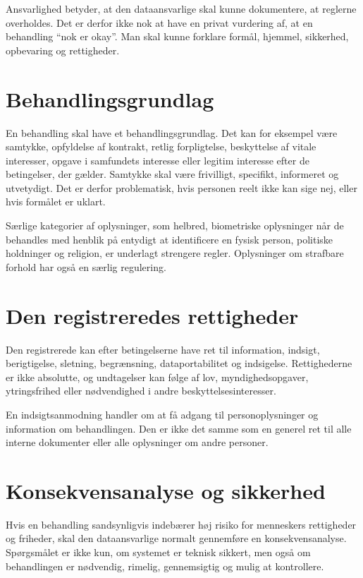 Ansvarlighed betyder, at den dataansvarlige skal kunne dokumentere, at reglerne overholdes. Det er derfor ikke nok at have en privat vurdering af, at en behandling ``nok er okay''. Man skal kunne forklare formål, hjemmel, sikkerhed, opbevaring og rettigheder.

\section{Behandlingsgrundlag}

En behandling skal have et behandlingsgrundlag. Det kan for eksempel være samtykke, opfyldelse af kontrakt, retlig forpligtelse, beskyttelse af vitale interesser, opgave i samfundets interesse eller legitim interesse efter de betingelser, der gælder. Samtykke skal være frivilligt, specifikt, informeret og utvetydigt. Det er derfor problematisk, hvis personen reelt ikke kan sige nej, eller hvis formålet er uklart.

Særlige kategorier af oplysninger, som helbred, biometriske oplysninger når de behandles med henblik på entydigt at identificere en fysisk person, politiske holdninger og religion, er underlagt strengere regler. Oplysninger om strafbare forhold har også en særlig regulering.

\section{Den registreredes rettigheder}

Den registrerede kan efter betingelserne have ret til information, indsigt, berigtigelse, sletning, begrænsning, dataportabilitet og indsigelse. Rettighederne er ikke absolutte, og undtagelser kan følge af lov, myndighedsopgaver, ytringsfrihed eller nødvendighed i andre beskyttelsesinteresser.

En indsigtsanmodning handler om at få adgang til personoplysninger og information om behandlingen. Den er ikke det samme som en generel ret til alle interne dokumenter eller alle oplysninger om andre personer.

\section{Konsekvensanalyse og sikkerhed}

Hvis en behandling sandsynligvis indebærer høj risiko for menneskers rettigheder og friheder, skal den dataansvarlige normalt gennemføre en konsekvensanalyse. Spørgsmålet er ikke kun, om systemet er teknisk sikkert, men også om behandlingen er nødvendig, rimelig, gennemsigtig og mulig at kontrollere.


